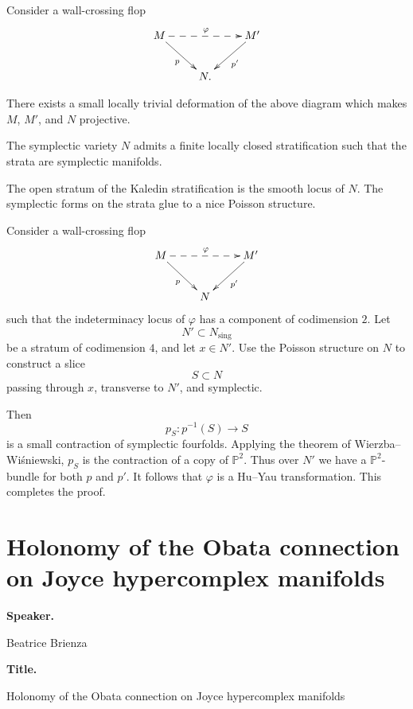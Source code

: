 Consider a wall-crossing flop
\[
\xymatrix{
M \ar@{-->}[rr]^{\varphi}
\ar[dr]_{p}
&&
M' \ar[dl]^{p'}
\\
& N. &
}
\]

\begin{theorem}
\label{theorem-exists-small}
There exists a small locally trivial
deformation of the above diagram which
makes $M$, $M'$, and $N$ projective.
\end{theorem}

\begin{theorem}[Kaledin]
\label{theorem-symplectic-variety}
The symplectic variety $N$ admits a
finite locally closed stratification
such that the strata are symplectic
manifolds.
\end{theorem}

\begin{remark}
\label{remark-open-stratum}
The open stratum of the Kaledin
stratification is the smooth locus of
$N$.
The symplectic forms on the strata
glue to a nice Poisson structure.
\end{remark}

Consider a wall-crossing flop
\[
\xymatrix{
M \ar@{-->}[rr]^{\varphi}
\ar[dr]_{p}
&&
M' \ar[dl]^{p'}
\\
& N &
}
\]
such that the indeterminacy locus of
$\varphi$ has a component of
codimension $2$.
Let
\[
N'\subset N_{\mathrm{sing}}
\]
be a stratum of codimension $4$, and
let $x\in N'$.
Use the Poisson structure on $N$ to
construct a slice
\[
S\subset N
\]
passing through $x$, transverse to
$N'$, and symplectic.

Then
\[
p_S:p^{-1}(S)\to S
\]
is a small contraction of symplectic
fourfolds.
Applying the theorem of
Wierzba--Wi\'sniewski, $p_S$ is the
contraction of a copy of
$\mathbb{P}^2$.
Thus over $N'$ we have a
$\mathbb{P}^2$-bundle for both $p$
and $p'$.
It follows that $\varphi$ is a
Hu--Yau transformation.
This completes the proof.

\section{Holonomy of the Obata
connection on Joyce hypercomplex
manifolds}
\label{section-holonomy-obata-joyce}

\medskip\noindent
{\bf Speaker.}

Beatrice Brienza

\medskip\noindent
{\bf Title.}

Holonomy of the Obata connection on
Joyce hypercomplex manifolds

